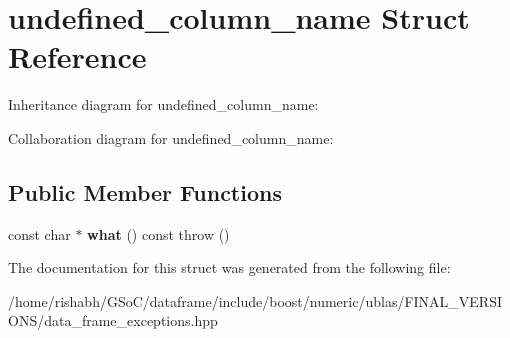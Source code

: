 \hypertarget{structundefined__column__name}{}\section{undefined\+\_\+column\+\_\+name Struct Reference}
\label{structundefined__column__name}


Inheritance diagram for undefined\+\_\+column\+\_\+name\+:


Collaboration diagram for undefined\+\_\+column\+\_\+name\+:
\subsection*{Public Member Functions}
\begin{DoxyCompactItemize}
\item 
const char $\ast$ {\bfseries what} () const   throw ()\hypertarget{structundefined__column__name_aaffc2d53160d85948f92f24062dd6d9f}{}\label{structundefined__column__name_aaffc2d53160d85948f92f24062dd6d9f}

\end{DoxyCompactItemize}


The documentation for this struct was generated from the following file\+:\begin{DoxyCompactItemize}
\item 
/home/rishabh/\+G\+So\+C/dataframe/include/boost/numeric/ublas/\+F\+I\+N\+A\+L\+\_\+\+V\+E\+R\+S\+I\+O\+N\+S/data\+\_\+frame\+\_\+exceptions.\+hpp\end{DoxyCompactItemize}
